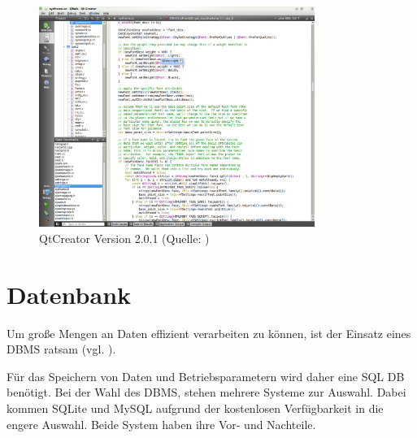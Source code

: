 \begin{figure}[H]
\begin{center}
\includegraphics[width=0.8\textwidth]{img/general/QtCreator.png}
\caption{QtCreator Version 2.0.1 (Quelle: \protect\cite{qtcreator})}
\label{QtCreator}
\end{center}
\end{figure}



\section{Datenbank}
\label{section_Datenbank}

Um große Mengen an Daten effizient verarbeiten zu können, ist der Einsatz eines \ac{DBMS} ratsam (vgl. \citep{saake2010datenbanken}).

Für das Speichern von Daten und Betriebsparametern wird daher eine \ac{SQL} \ac{DB} benötigt. Bei der Wahl des \ac{DBMS}, stehen mehrere Systeme zur Auswahl. Dabei kommen SQLite und MySQL aufgrund der kostenlosen Verfügbarkeit in die engere Auswahl.
Beide System haben ihre Vor- und Nachteile.


